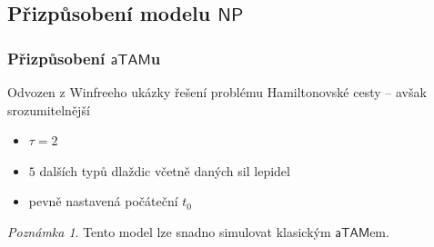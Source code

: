 \documentclass[10pt]{beamer}
\newcommand{\NP}{\mathsf{NP}}
\newcommand{\atam}{\mathsf{aTAM}}
\theoremstyle{definition}
\theoremstyle{remark}
\newtheorem{pozn}{Poznámka}
\begin{document}
\subsection{Přizpůsobení modelu $\NP$}
\begin{frame}
\frametitle{Přizpůsobení $\atam$u}
	Odvozen z Winfreeho ukázky řešení problému Hamiltonovské cesty -- avšak srozumitelnější
	\begin{itemize}
		\item $\tau=2$
		\item $5$ dalších typů dlaždic včetně daných sil lepidel
		\item pevně nastavená počáteční $t_0$
	\end{itemize}
	\begin{pozn}
		Tento model lze snadno simulovat klasickým $\atam$em.
	\end{pozn}
\end{frame}
\end{document}
